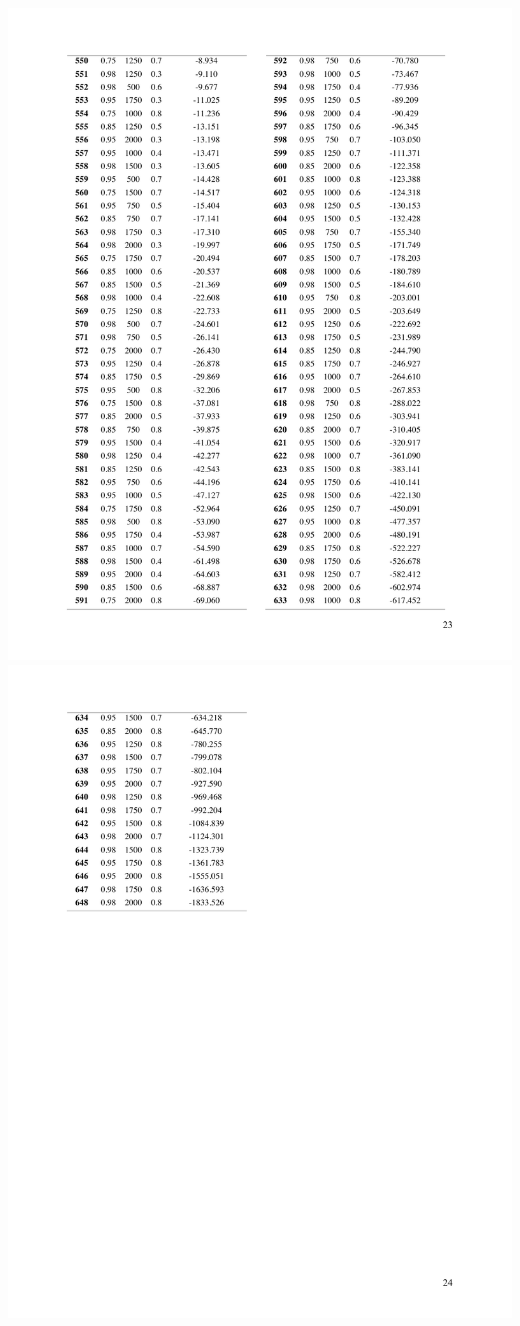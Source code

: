 \documentclass[a4paper, twoside]{templates/ociamthesis}
\begin{document}
\includegraphics[width=1\linewidth]{pdf_chapters/lights/lights_supp_crop_Part27}
\includegraphics[width=1\linewidth]{pdf_chapters/lights/lights_supp_crop_Part28}
\end{document}
